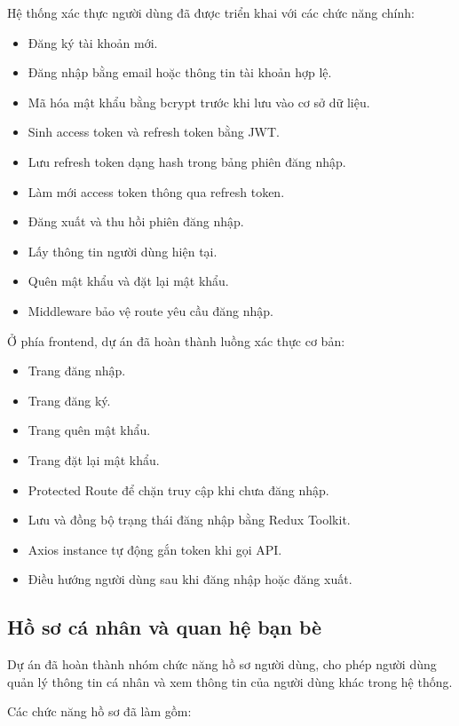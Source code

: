 \documentclass[12pt,a4paper]{article}
\begin{document}
Hệ thống xác thực người dùng đã được triển khai với các chức năng chính:

\begin{itemize}
  \item Đăng ký tài khoản mới.
  \item Đăng nhập bằng email hoặc thông tin tài khoản hợp lệ.
  \item Mã hóa mật khẩu bằng bcrypt trước khi lưu vào cơ sở dữ liệu.
  \item Sinh access token và refresh token bằng JWT.
  \item Lưu refresh token dạng hash trong bảng phiên đăng nhập.
  \item Làm mới access token thông qua refresh token.
  \item Đăng xuất và thu hồi phiên đăng nhập.
  \item Lấy thông tin người dùng hiện tại.
  \item Quên mật khẩu và đặt lại mật khẩu.
  \item Middleware bảo vệ route yêu cầu đăng nhập.
\end{itemize}

Ở phía frontend, dự án đã hoàn thành luồng xác thực cơ bản:

\begin{itemize}
  \item Trang đăng nhập.
  \item Trang đăng ký.
  \item Trang quên mật khẩu.
  \item Trang đặt lại mật khẩu.
  \item Protected Route để chặn truy cập khi chưa đăng nhập.
  \item Lưu và đồng bộ trạng thái đăng nhập bằng Redux Toolkit.
  \item Axios instance tự động gắn token khi gọi API.
  \item Điều hướng người dùng sau khi đăng nhập hoặc đăng xuất.
\end{itemize}

\subsection{Hồ sơ cá nhân và quan hệ bạn bè}

Dự án đã hoàn thành nhóm chức năng hồ sơ người dùng, cho phép người dùng quản lý thông tin cá nhân và xem thông tin của người dùng khác trong hệ thống.

Các chức năng hồ sơ đã làm gồm:
\end{document}
